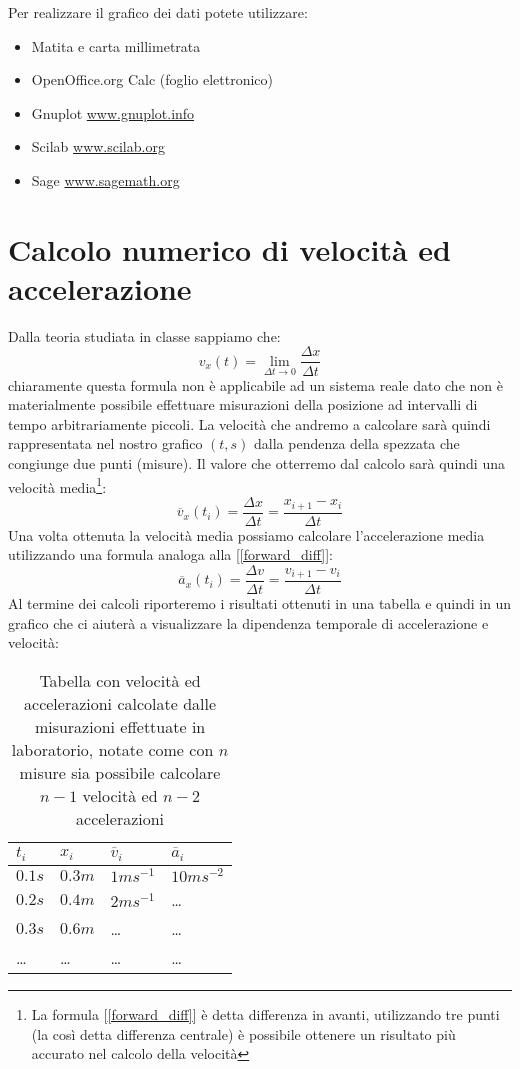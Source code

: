 \documentclass[a4paper,10pt,oneside]{article}
\begin{document}
Per realizzare il grafico dei dati potete utilizzare:
\begin{itemize}
 \item Matita e carta millimetrata
 \item OpenOffice.org Calc (foglio elettronico)
 \item Gnuplot \url{www.gnuplot.info}
 \item Scilab \url{www.scilab.org}
 \item Sage \url{www.sagemath.org}
\end{itemize}
\section{Calcolo numerico di velocità ed accelerazione}


Dalla teoria studiata in classe sappiamo che:
\begin{equation}
 v_x(t)=\lim _{\Delta t \to 0} \frac {\Delta x}{\Delta t}
\end{equation}
chiaramente questa formula non è applicabile ad un sistema reale dato che non è materialmente possibile effettuare misurazioni della posizione ad intervalli di tempo arbitrariamente piccoli. La velocità che andremo a calcolare sarà quindi rappresentata nel nostro grafico $(t,s)$ dalla pendenza della spezzata che congiunge due punti (misure). Il valore che otterremo dal calcolo sarà quindi una velocità media\footnote{
La formula [\ref{forward_diff}] è detta differenza in avanti, utilizzando tre punti (la così detta differenza centrale) è possibile ottenere un risultato più accurato nel calcolo della velocità }:
\begin{equation}\label{forward_diff}
\overline{v}_x(t_i)=\frac{\Delta x}{\Delta t}=\frac{x_{i+1}-x_i}{\Delta t}
\end{equation}
Una volta ottenuta la velocità media possiamo calcolare l'accelerazione media utilizzando una formula analoga alla [\ref{forward_diff}]:
\begin{equation}
 \overline{a}_x(t_i)=\frac{\Delta v}{\Delta t}=\frac{v_{i+1}-v_i}{\Delta t}
\end{equation}
Al termine dei calcoli riporteremo i risultati ottenuti in una tabella e quindi in un grafico che ci aiuterà a visualizzare la dipendenza temporale di accelerazione  e velocità:
\begin{table}[H]
\begin{center}
\begin{tabular}{llll}\toprule
$t_i$ & $x_i$& $\overline{v}_i$& $\overline{a}_i$ \\ \midrule
$0.1s$&$0.3m$&$1ms^{-1}$&$10ms^{-2}$\\
$0.2s$&$0.4m$&$2ms^{-1}$&\ldots\\
$0.3s$&$0.6m$&\dots&\ldots\\
\ldots &\ldots&\dots&\dots \\ \bottomrule
\end{tabular}\caption{Tabella con velocità ed accelerazioni calcolate dalle misurazioni effettuate in laboratorio, notate come con $n$ misure sia possibile calcolare $n-1$ velocità ed $n-2$ accelerazioni}\label{tab:extab1}
\end{center}
\end{table}
\end{document}

